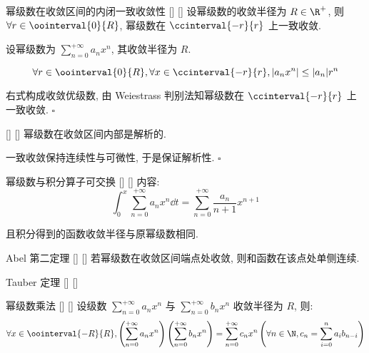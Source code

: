 \documentclass[UTF8]{ctexart}
\begin{document}
			\begin{thm}
			    []
			    {幂级数在收敛区间的内闭一致收敛性}
			    []
			    []
				设幂级数的收敛半径为 \(R\in\R^+\), 则 \(\forall r\in\oointerval{0}{R}\), 幂级数在 \(\ccinterval{-r}{r}\) 上一致收敛. 
			\end{thm}

			\begin{prf}
				设幂级数为 \(\sum\limits_{n=0}^{+\infty}a_n x^n\), 其收敛半径为 \(R\). 

				\[\forall r\in\oointerval{0}{R}, \forall x\in\ccinterval{-r}{r}, |a_n x^n|\leq |a_n|r^n\]

				右式构成收敛优级数, 由 Weiestrass 判别法知幂级数在 \(\ccinterval{-r}{r}\) 上一致收敛. 
				\(\square\)
			\end{prf}

			\begin{crl}
			    []
			    {}
			    []
			    []
				幂级数在收敛区间内部是解析的. 
			\end{crl}

			\begin{prf}
				一致收敛保持连续性与可微性, 于是保证解析性. 
				\(\square\)
			\end{prf}

			\begin{crl}
			    []
			    {幂级数与积分算子可交换}
			    []
			    []
				内容: 
				\[\int_0^x\sum_{n=0}^{+\infty}a_n x^n\dd t=\sum_{n=0}^{+\infty}\frac{a_n}{n+1}x^{n+1}\]

				且积分得到的函数收敛半径与原幂级数相同. 
			\end{crl}

			\begin{thm}
			    []
			    {Abel 第二定理}
			    []
			    []
				若幂级数在收敛区间端点处收敛, 则和函数在该点处单侧连续. 
			\end{thm}

			\begin{thm}
			    []
			    {Tauber 定理}
			    []
			    []
			\end{thm}

			\begin{thm}
			    []
			    {幂级数乘法}
			    []
			    []
				设级数 \(\sum\limits_{n=0}^{+\infty}a_n x^n\) 与 \(\sum\limits_{n=0}^{+\infty}b_n x^n\) 收敛半径为 \(R\), 则: 
				\[\forall x\in\oointerval{-R}{R}, \left(\sum_{n=0}^{+\infty}a_n x^n\right)\left(\sum_{n=0}^{+\infty}b_n x^n\right)=\sum_{n=0}^{+\infty}c_n x^n\left(\forall n\in\N, c_n=\sum_{i=0}^{n}a_i b_{n-i}\right)\]
			\end{thm}
\end{document}
